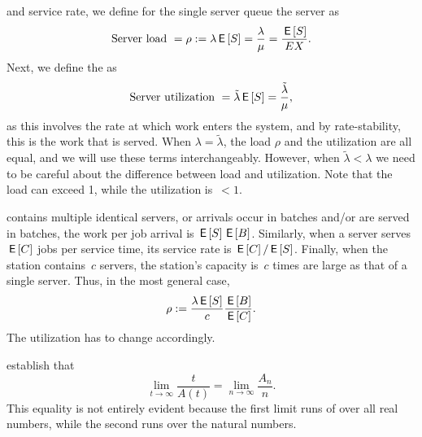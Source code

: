 \documentclass[queueing-book.tex]{subfiles}
\begin{document}
 and service rate, we define for the single server queue the server  as
\begin{equation*}
\textrm{Server load } = \rho :=  \lambda \,\mathsf{E}\left[S\right]=\frac{\lambda}{\mu} = \frac{\,\mathsf{E}\left[S\right]}{E X}.
\end{equation*}
Next, we define the  as
\begin{equation*}
\textrm{Server utilization } = \tilde \lambda \,\mathsf{E}\left[S\right] = \frac{\tilde \lambda}{\mu},
\end{equation*}
as this involves the rate at which work enters the system, and by rate-stability, this is the work that is served.
When $\lambda = \tilde \lambda$,  the load $\rho$ and the utilization are all equal, and we will use these terms interchangeably.
However, when $\tilde \lambda < \lambda$  we need to be careful about the difference between load and utilization.
Note that the load can exceed 1, while the utilization is~$< 1$.


 contains multiple identical servers, or arrivals occur in batches and/or are served in batches, the work per job arrival is $\,\mathsf{E}\left[S\right] \,\mathsf{E}\left[B\right]$.
Similarly, when a server serves $\,\mathsf{E}\left[C\right]$ jobs per service time, its service rate is $\,\mathsf{E}\left[C\right]/\,\mathsf{E}\left[S\right]$. Finally, when the station contains~$c$ servers, the station's capacity is~$c$ times are large as that of a single server. Thus, in the most general case,
\begin{equation*}
\rho := \frac{\lambda \,\mathsf{E}\left[S\right]}c \frac{\,\mathsf{E}\left[B\right]}{\,\mathsf{E}\left[C\right]}.
\end{equation*}
The utilization has to change accordingly.


 establish that
\begin{equation}\label{eq:limits}
\lim_{t\to\infty} \frac t {A(t)} = \lim_{n\to\infty} \frac {A_{n}} n.
\end{equation}
This equality is not entirely evident because the first limit runs of over all real numbers, while the second runs over the natural numbers.
\end{document}
